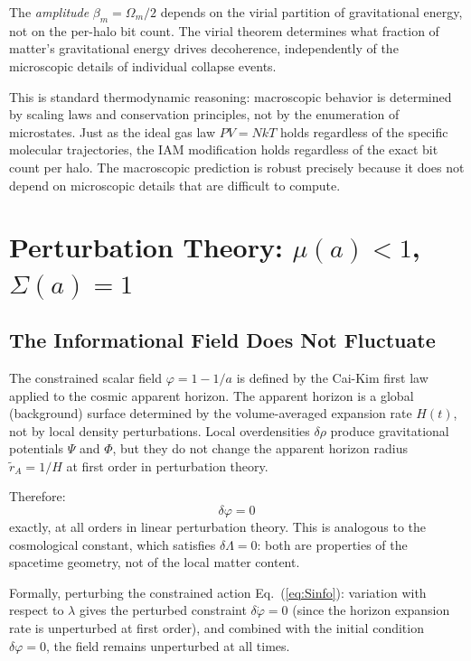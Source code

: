 \documentclass[aps,prd,twocolumn,superscriptaddress,nofootinbib]{revtex4-2}
\begin{document}
The \textit{amplitude} $\beta_m = \Omega_m/2$ depends on the virial partition of gravitational energy, not on the per-halo bit count. The virial theorem determines what fraction of matter's gravitational energy drives decoherence, independently of the microscopic details of individual collapse events.

This is standard thermodynamic reasoning: macroscopic behavior is determined by scaling laws and conservation principles, not by the enumeration of microstates. Just as the ideal gas law $PV = NkT$ holds regardless of the specific molecular trajectories, the IAM modification holds regardless of the exact bit count per halo. The macroscopic prediction is robust precisely because it does not depend on microscopic details that are difficult to compute.

\section{Perturbation Theory: $\mu(a) < 1$, $\Sigma(a) = 1$}
\label{sec:perturbations}

\subsection{The Informational Field Does Not Fluctuate}

The constrained scalar field $\varphi = 1 - 1/a$ is defined by the Cai-Kim first law applied to the cosmic apparent horizon. The apparent horizon is a global (background) surface determined by the volume-averaged expansion rate $H(t)$, not by local density perturbations. Local overdensities $\delta\rho$ produce gravitational potentials $\Psi$ and $\Phi$, but they do not change the apparent horizon radius $\tilde{r}_A = 1/H$ at first order in perturbation theory.

Therefore:
\begin{equation}
\delta\varphi = 0
\label{eq:dphi_zero}
\end{equation}
exactly, at all orders in linear perturbation theory. This is analogous to the cosmological constant, which satisfies $\delta\Lambda = 0$: both are properties of the spacetime geometry, not of the local matter content.

Formally, perturbing the constrained action Eq.~(\ref{eq:Sinfo}): variation with respect to $\lambda$ gives the perturbed constraint $\delta\dot{\varphi} = 0$ (since the horizon expansion rate is unperturbed at first order), and combined with the initial condition $\delta\varphi = 0$, the field remains unperturbed at all times.
\end{document}
